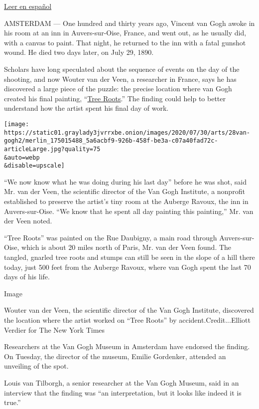 \href{https://www.nytimes3xbfgragh.onion/es/2020/07/29/espanol/cultura/vincent-van-gogh-raices-arbol.html}{Leer
en español}

AMSTERDAM --- One hundred and thirty years ago, Vincent van Gogh awoke
in his room at an inn in Auvers-sur-Oise, France, and went out, as he
usually did, with a canvas to paint. That night, he returned to the inn
with a fatal gunshot wound. He died two days later, on July 29, 1890.

Scholars have long speculated about the sequence of events on the day of
the shooting, and now Wouter van der Veen, a researcher in France, says
he has discovered a large piece of the puzzle: the precise location
where van Gogh created his final painting,
``\href{https://www.vangoghmuseum.nl/en/collection/s0195V1962}{Tree
Roots}.'' The finding could help to better understand how the artist
spent his final day of work.

\texttt{[image: https://static01.graylady3jvrrxbe.onion/images/2020/07/30/arts/28van-gogh2/merlin\_175015488\_5a6acbf9-926b-458f-be3a-c07a40fad72c-articleLarge.jpg?quality=75\\\&auto=webp\\\&disable=upscale]}

``We now know what he was doing during his last day'' before he was
shot, said Mr. van der Veen, the scientific director of the Van Gogh
Institute, a nonprofit established to preserve the artist's tiny room at
the Auberge Ravoux, the inn in Auvers-sur-Oise. ``We know that he spent
all day painting this painting,'' Mr. van der Veen noted.

``Tree Roots'' was painted on the Rue Daubigny, a main road through
Auvers-sur-Oise, which is about 20 miles north of Paris, Mr. van der
Veen found. The tangled, gnarled tree roots and stumps can still be seen
in the slope of a hill there today, just 500 feet from the Auberge
Ravoux, where van Gogh spent the last 70 days of his life.

Image

Wouter van der Veen, the scientific director of the Van Gogh Institute,
discovered the location where the artist worked on ``Tree Roots'' by
accident.Credit...Elliott Verdier for The New York Times

Researchers at the Van Gogh Museum in Amsterdam have endorsed the
finding. On Tuesday, the director of the museum, Emilie Gordenker,
attended an unveiling of the spot.

Louis van Tilborgh, a senior researcher at the Van Gogh Museum, said in
an interview that the finding was ``an interpretation, but it looks like
indeed it is true.''

